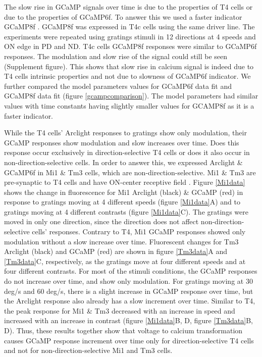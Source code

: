 \documentclass[9pt,lineno]{elife}
\begin{document}
The slow rise in GCaMP signals over time is due to the properties of T4 cells or due to the properties of GCaMP6f. To answer this we used a faster indicator GCaMP8f \parencite{Zhang2020}. GCaMP8f was expressed in T4c cells using the same driver line. The experiments were repeated using gratings stimuli in 12 directions at 4 speeds and ON edge in PD and ND. T4c cells GCaMP8f responses were similar to GCaMP6f responses. The modulation and slow rise of the signal could still be seen (Supplement figure). This shows that slow rise in calcium signal is indeed due to T4 cells intrinsic properties and not due to slowness of GCaMP6f indicator. We further compared the model parameters values for GCaMP6f data fit and GCaMP8f data fit (figure \ref{gcampcomparison}). The model parameters had similar values with time constants having slightly smaller values for GCAMP8f as it is a faster indicator.

While the T4 cells' Arclight responses to gratings show only modulation, their GCaMP responses show modulation and slow increases over time. Does this response occur exclusively in direction-selective T4 cells or does it also occur in non-direction-selective cells. In order to answer this, we expressed Arclight \& GCaMP6f in Mi1 \& Tm3 cells, which are non-direction-selective. Mi1 \& Tm3 are pre-synaptic to T4 cells and have ON-center receptive field \parencite{Takemura2017, Arenz2017}. Figure \ref{Mi1data} shows the change in fluorescence for Mi1 Arclight (black) \& GCaMP (red) in response to gratings moving at 4 different speeds (figure \ref{Mi1data}A) and to gratings moving at 4 different contrasts (figure \ref{Mi1data}C). The gratings were moved in only one direction, since the direction does not affect non-direction-selective cells' responses. Contrary to T4, Mi1 GCaMP responses showed only modulation without a slow increase over time. Fluorescent changes for Tm3 Arclight (black) and GCaMP (red) are shown in figure \ref{Tm3data}A and \ref{Tm3data}C, respectively, as the gratings move at four different speeds and at four different contrasts. For most of the stimuli conditions, the GCaMP responses do not increase over time, and show only modulation. For gratings moving at 30 deg/s and 60 deg/s, there is a slight increase in GCaMP response over time, but the Arclight response also already has a slow increment over time. Similar to T4, the peak response for Mi1 \& Tm3 decreased with an increase in speed and increased with an increase in contrast (figure \ref{Mi1data}B, D, figure \ref{Tm3data}B, D). Thus, these results together show that voltage to calcium transformation causes GCaMP response increment over time only for direction-selective T4 cells and not for non-direction-selective Mi1 and Tm3 cells.
\end{document}

